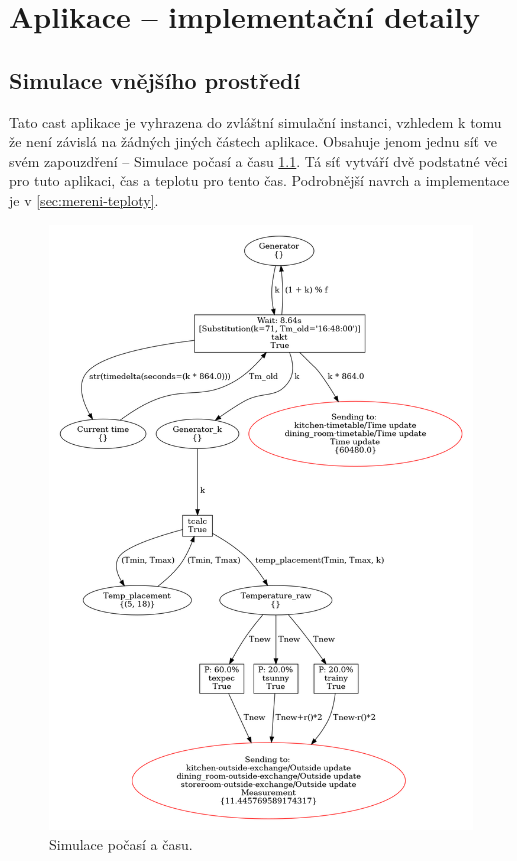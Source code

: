 \chapter{Aplikace -- implementační detaily}

\section{Simulace vnějšího prostředí}
Tato cast aplikace je vyhrazena do zvláštní simulační instanci, vzhledem k tomu že není závislá na žádných jiných částech aplikace. Obsahuje jenom jednu síť ve svém zapouzdření -- Simulace počasí a času \ref{weather-viz}. Tá síť vytváří dvě podstatné věci pro tuto aplikaci, čas a teplotu pro tento čas. Podrobnější navrch a implementace je v \ref{sec:mereni-teploty}.

\begin{figure}[htb]
  \centering
  \includegraphics[width=\textwidth]{obrazky-figures/weather-sim.png}
  \caption{Simulace počasí a času.}
  \label{weather-viz}
\end{figure}


